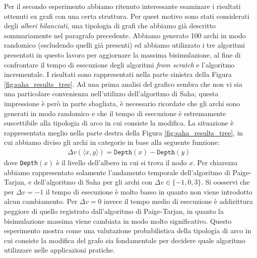 Per il secondo esperimento abbiamo ritenuto interessante esaminare i risultati ottenuti su grafi con una certa struttura. Per quest motivo sono stati considerati degli \emph{alberi bilanciati}, una tipologia di grafi che abbiamo già descritto sommariamente nel paragrafo precedente. Abbiamo generato 100 archi in modo randomico (escludendo quelli già presenti) ed abbiamo utilizzato i tre algoritmi presentati in questo lavoro per aggiornare la massima bisimulazione, al fine di confrontare il tempo di esecuzione degli algoritmi \emph{from scratch} e l'algoritmo incrementale. I risultati sono rappresentati nella parte sinistra della Figura \ref{fig:saha_results_tree}. Ad una prima analisi del grafico sembra che non vi sia una particolare convenienza nell'utilizzo dell'algoritmo di Saha; questa impressione è però in parte sbagliata, è necessario ricordate che gli archi sono generati in modo randomico e che il tempo di esecuzione è estremamente suscettibile alla tipologia di arco in cui consiste la modifica. La situazione è rappresentata meglio nella parte destra della Figura \ref{fig:saha_results_tree}, in cui abbiamo diviso gli archi in categorie in base alla seguente funzione:
\begin{gather*}
    \Delta v(\langle x,y \rangle) = \texttt{Depth}(x) - \texttt{Depth}(y)
\end{gather*}
dove \texttt{Depth}$(x)$ è il livello dell'albero in cui si trova il nodo $x$. Per chiarezza abbiamo rappresentato solamente l'andamento temporale dell'algoritmo di Paige-Tarjan, e dell'algoritmo di Saha per gli archi con $\Delta v \in \{-1,0,3\}$. Si oosservi che per $\Delta v = -1$ il tempo di esecuzione è molto basso in quanto non viene introdotto alcun cambiamento. Per $\Delta v = 0$ invece il tempo medio di esecuzione è addirittura peggiore di quello registrato dall'algoritmo di Paige-Tarjan, in quanto la bisimulazione massima viene cambiata in modo molto significativo. Questo esperimento mostra come una valutazione probabilistica della tipologia di arco in cui consiste la modifica del grafo sia fondamentale per decidere quale algoritmo utilizzare nelle applicazioni pratiche.

